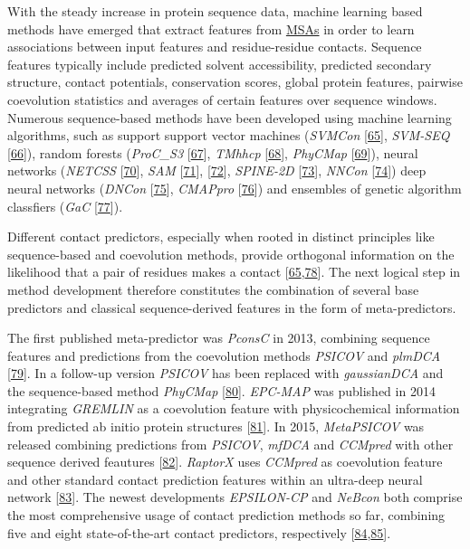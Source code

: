 \documentclass[11pt,a4paper,twoside]{book}
\theoremstyle{definition}
\theoremstyle{definition}
\theoremstyle{remark}
\begin{document}
With the steady increase in protein sequence data, machine learning
based methods have emerged that extract features from
\protect\hyperlink{abbrev}{MSAs} in order to learn associations between
input features and residue-residue contacts. Sequence features typically
include predicted solvent accessibility, predicted secondary structure,
contact potentials, conservation scores, global protein features,
pairwise coevolution statistics and averages of certain features over
sequence windows. Numerous sequence-based methods have been developed
using machine learning algorithms, such as support support vector
machines (\emph{SVMCon} {[}\protect\hyperlink{ref-Cheng2007}{65}{]},
\emph{SVM-SEQ} {[}\protect\hyperlink{ref-Wu2008}{66}{]}), random forests
(\emph{ProC\_S3} {[}\protect\hyperlink{ref-Li2011}{67}{]}, \emph{TMhhcp}
{[}\protect\hyperlink{ref-Wang2011}{68}{]}, \emph{PhyCMap}
{[}\protect\hyperlink{ref-Wang2013}{69}{]}), neural networks
(\emph{NETCSS} {[}\protect\hyperlink{ref-Fariselli2001a}{70}{]},
\emph{SAM} {[}\protect\hyperlink{ref-Shackelford2007}{71}{]},
{[}\protect\hyperlink{ref-Hamilton2004a}{72}{]}, \emph{SPINE-2D}
{[}\protect\hyperlink{ref-Xue2009a}{73}{]}, \emph{NNCon}
{[}\protect\hyperlink{ref-Tegge2009a}{74}{]}) deep neural networks
(\emph{DNCon} {[}\protect\hyperlink{ref-Eickholt2012}{75}{]},
\emph{CMAPpro} {[}\protect\hyperlink{ref-DiLena2012a}{76}{]}) and
ensembles of genetic algorithm classfiers (\emph{GaC}
{[}\protect\hyperlink{ref-Chen2010}{77}{]}).

Different contact predictors, especially when rooted in distinct
principles like sequence-based and coevolution methods, provide
orthogonal information on the likelihood that a pair of residues makes a
contact
{[}\protect\hyperlink{ref-Cheng2007}{65},\protect\hyperlink{ref-Jones2015}{78}{]}.
The next logical step in method development therefore constitutes the
combination of several base predictors and classical sequence-derived
features in the form of meta-predictors.

The first published meta-predictor was \emph{PconsC} in 2013, combining
sequence features and predictions from the coevolution methods
\emph{PSICOV} and \emph{plmDCA}
{[}\protect\hyperlink{ref-Skwark2013}{79}{]}. In a follow-up version
\emph{PSICOV} has been replaced with \emph{gaussianDCA} and the
sequence-based method \emph{PhyCMap}
{[}\protect\hyperlink{ref-Skwark2016}{80}{]}. \emph{EPC-MAP} was
published in 2014 integrating \emph{GREMLIN} as a coevolution feature
with physicochemical information from predicted ab initio protein
structures {[}\protect\hyperlink{ref-Schneider2014}{81}{]}. In 2015,
\emph{MetaPSICOV} was released combining predictions from \emph{PSICOV},
\emph{mfDCA} and \emph{CCMpred} with other sequence derived feautures
{[}\protect\hyperlink{ref-Jones2015a}{82}{]}. \emph{RaptorX} uses
\emph{CCMpred} as coevolution feature and other standard contact
prediction features within an ultra-deep neural network
{[}\protect\hyperlink{ref-Wang2016a}{83}{]}. The newest developments
\emph{EPSILON-CP} and \emph{NeBcon} both comprise the most comprehensive
usage of contact prediction methods so far, combining five and eight
state-of-the-art contact predictors, respectively
{[}\protect\hyperlink{ref-Stahl2017}{84},\protect\hyperlink{ref-He2017}{85}{]}.
\end{document}
